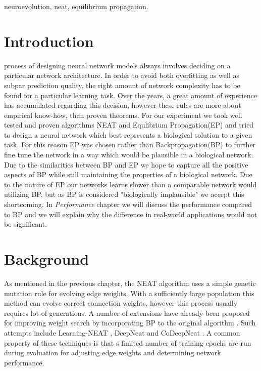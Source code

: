 \documentclass[lettersize,journal]{IEEEtran}
\begin{document}
		
		\begin{IEEEkeywords}
			neuroevolution, neat, equilibrium propagation.
		\end{IEEEkeywords}
		
		\section{Introduction}
		 process of designing neural network models always involves deciding on a particular network architecture. In order to avoid both overfitting as well as subpar prediction quality, the right amount of network complexity has to be found for a particular learning task. Over the years, a great amount of experience has accumulated regarding this decision, however these rules are more about empirical know-how, than proven theorems. For our experiment we took well tested and proven algorithms NEAT and Equlibrium Propagation(EP)\cite{eqprop} and tried to design a neural network which best represents a biological solution to a given task. For this reason EP was chosen rather than Backpropagation(BP)\cite{backprop} to further fine tune the network in a way which would be plausible in a biological network. Due to the similarities between BP and EP we hope to capture all the positive aspects of BP while still maintaining the properties of a biological network. Due to the nature of EP our networks learns slower than a comparable network would utilizing BP, but as BP is considered "biologically implausible" we accept this shortcoming. In \textit{Performance} chapter we will discuss the performance compared to BP and we will explain why the difference in real-world applications would not be significant.
		
		\section{Background}
		As mentioned in the previous chapter, the NEAT algorithm uses a simple genetic mutation rule for evolving edge weights. With a sufficiently large population this method can evolve correct connection weights, however this process usually requires lot of generations. A number of extensions have already been proposed for improving weight search by incorporating BP to the original algorithm \cite{neatsurvey}. Such attempts include Learning-NEAT \cite{lneat}, DeepNeat and CoDeepNeat \cite{codeepneat}. A common property of these techniques is that s limited number of training epochs are run during evaluation for adjusting edge weights and determining network performance. 
		
\end{document}
